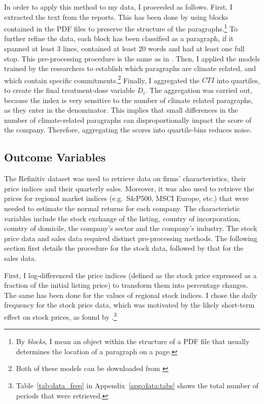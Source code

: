 \documentclass[12pt]{article}
\begin{document}
In order to apply this method to my data, I proceeded as follows. First, I extracted the text from the reports. This has been done by using blocks contained in the PDF files to preserve the structure of the paragraphs.\footnote{By \textit{blocks}, I mean an object within the structure of a PDF file that usually determines the location of a paragraph on a page.} To further refine the data, each block has been classified as a paragraph, if it spanned at least 3 lines, contained at least 20 words and had at least one full stop. This pre-processing procedure is the same as in \textcite{binglerHowCheapTalk2024}. Then, I applied the models trained by the researchers to establish which paragraphs are climate related, and which contain specific commitments.\footnote{Both of these models can be downloaded from \href{https://huggingface.co/climatebert}{}} Finally, I aggregated the $CTI$ into quartiles, to create the final treatment-dose variable $D_i$. The aggregation was carried out, because the index is very sensitive to the number of climate related paragraphs, as they enter in the denominator. This implies that small differences in the number of climate-related  paragraphs can disproportionally impact the score of the company. Therefore, aggregating the scores into quartile-bins reduces noise.



\subsection{Outcome Variables}

The Refinitiv dataset was used to retrieve data on firms' characteristics, their price indices and their quarterly sales. Moreover, it was also used to retrieve the prices for regional market indices (e.g.\ S\&P500, MSCI Europe, etc.) that were needed to estimate the normal returns for each company. The characteristic variables include the stock exchange of the listing, country of incorporation, country of domicile, the company's sector and the company's industry. The stock price data and sales data required distinct pre-processing methods. The following section first details the procedure for the stock data, followed by that for the sales data.

First, I log-differenced the price indices (defined as the stock price expressed as a fraction of the initial listing price) to transform them into percentage changes. The same has been done for the values of regional stock indices. I chose the daily frequency for the stock price data, which was motivated by the likely short-term effect on stock prices, as found by \textcite{schusterStockPriceReactions2023}.\footnote{Table~\ref{tab:data_freq} in Appendix~\ref{app:data:tabs} shows the total number of periods that were retrieved.}
\end{document}
